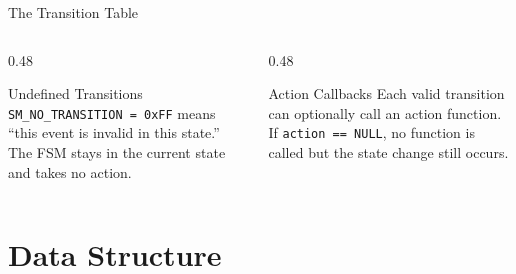 \documentclass[aspectratio=169, 10pt]{beamer}
\begin{document}
\begin{frame}{The Transition Table}
\vspace{0.3em}
\begin{columns}[T]
\begin{column}{0.48\textwidth}
\begin{block}{Undefined Transitions}
\texttt{SM\_NO\_TRANSITION = 0xFF} means ``this event
is invalid in this state.'' The FSM stays in the
current state and takes no action.
\end{block}
\end{column}
\begin{column}{0.48\textwidth}
\begin{block}{Action Callbacks}
Each valid transition can optionally call an action function.
If \texttt{action == NULL}, no function is called but the
state change still occurs.
\end{block}
\end{column}
\end{columns}
\end{frame}

\section{Data Structure}
\end{document}
